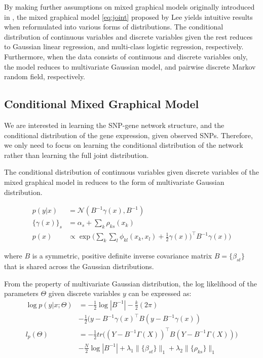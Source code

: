 \documentclass{article}
\begin{document}
By making further assumptions on mixed graphical models originally introduced in \cite{lauritzen1989graphical}, the mixed graphical model \ref{eq:joint} proposed by Lee \cite{lee2013structure} yields intuitive results when reformulated into various forms of distributions. The conditional distribution of continuous variables and discrete variables given the rest reduces to Gaussian linear regression, and multi-class logistic regression, respectively. Furthermore, when the data consists of continuous and discrete variables only, the model reduces to multivariate Gaussian model, and pairwise discrete Markov random field, respectively. 

\subsection{Conditional Mixed Graphical Model}
We are interested in learning the SNP-gene network structure, and the conditional distribution of the gene expression, given observed SNPs.
Therefore, we only need to focus on learning the conditional distribution of the network rather than learning the full joint distribution. 

The conditional distribution of continuous variables given discrete variables of the mixed graphical model in \cite{lee2013structure} reduces to the form of multivariate Gaussian distribution.

\begin{align}
p(y|x) &= \mathcal{N}(B^{-1}\gamma(x), B^{-1}) \label{eq:cond_prob}\\
\{\gamma(x)\}_s &= \alpha_s + \sum_{k} \rho_{ks}(x_k) \\
p(x) &\propto \exp \Big( \sum_{k} \sum_{l} \phi_{kl}(x_k, x_l) + \frac{1}{2} \gamma(x))^\intercal B^{-1} \gamma(x) \Big)
\end{align}

where $B$ is a symmetric, positive definite inverse covariance matrix $B = \{ \beta_{st}\}$ that is shared across the Gaussian distributions. 

From the property of multivariate Gaussian distribution, the log likelihood of the parameters $\Theta$ given discrete variables $y$ can be expressed as:
\begin{align}
\log p(y | x; \Theta) &= -\frac{1}{2}\log |B^{-1}| -\frac{k}{2} (2 \pi) \nonumber    \\
& -\frac{1}{2} (y - B^{-1} \gamma(x)^\intercal B (y - B^{-1} \gamma(x)) \label{eq:loglikli} \\ 
l_p(\Theta) &= -\frac{1}{2} tr\Big((Y - B^{-1} \Gamma(X))^\intercal B (Y - B^{-1} \Gamma(X)) \Big) \nonumber \\
& -\frac{N}{2} \log|B^{-1}| + \lambda_1 \|\{\beta_{st}\}\|_1 + \lambda_2 \|\{\rho_{ks}\}\|_1 \label{eq:obj}
\end{align}
\end{document}
